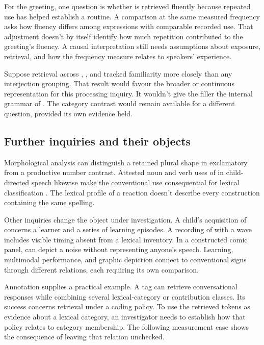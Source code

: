 \documentclass[12pt]{article}
\begin{document}
For the greeting, one question is whether  is
retrieved fluently because repeated use has helped establish a routine.
A comparison at the same measured frequency asks how fluency differs
among expressions with comparable recorded use. That adjustment doesn't
by itself identify how much repetition contributed to the greeting's
fluency. A causal interpretation still needs assumptions about exposure,
retrieval, and how the frequency measure relates to speakers' experience.

Suppose retrieval across , , and
 tracked familiarity more closely than any
interjection grouping. That result would favour the broader or continuous
representation for this processing inquiry. It wouldn't give the filler
 the internal grammar of . The
category contrast would remain available for a different question,
provided its own evidence held.

\subsection{Further inquiries and their objects}

Morphological analysis can distinguish a retained plural shape in
exclamatory  from a productive number contrast. Attested
noun and verb uses of  in child-directed speech likewise
make the conventional use consequential for lexical classification
\citep[36]{stange2016}. The lexical profile of a reaction doesn't describe
every construction containing the same spelling.

Other inquiries change the object under investigation. A child's acquisition
of  concerns a learner and a series of learning episodes.
A recording of  with a wave includes visible timing absent
from a lexical inventory. In a constructed comic panel, 
can depict a noise without representing anyone's speech. Learning,
multimodal performance, and graphic depiction connect to conventional signs
through different relations, each requiring its own comparison.

Annotation supplies a practical example. A tag can retrieve conversational
responses while combining several lexical-category or contribution classes. Its
success concerns retrieval under a coding policy. To use the retrieved
tokens as evidence about a lexical category, an investigator needs
to establish how that policy relates to category membership. The
following measurement case shows the consequence of leaving that relation
unchecked.
\end{document}
